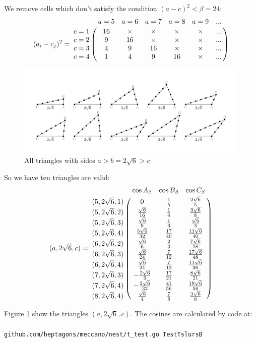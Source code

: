 \documentclass[11pt]{article}
\begin{document}
We remove cells which don't satisfy the condition $(a-c)^2 < \beta = 24$:
\begin {equation}\label{E:12}
(a_i - c_j)^2 =\bordermatrix{~ & a=5 & a=6 & a=7 & a=8 & a=9 & ...\cr
c=1 & 16 & \times & \times & \times & \times & ...\cr    
c=2 &  9 & 16 & \times & \times & \times & ...\cr    
c=3 &  4 &  9 & 16 & \times & \times & ...\cr    
c=4 &  1 &  4 &  9 & 16 & \times & ...\cr}
\end {equation}

\begin{figure}[htp]
\centering
\includegraphics[scale=0.9]{tslurB}
\caption{All triangles with sides $a > b = 2\sqrt{6} > c$}
\label{tslurB}
\end{figure}

So we have ten triangles are valid:
\begin {equation}\label{E:13}
(a,2\sqrt{6},c) =\bordermatrix{~ & \cos{A_{\beta}} & \cos{B_{\beta}} & \cos{C_{\beta}} \cr
(5,2\sqrt{6},1) & 0         & \frac{1}{5} & \frac{2\sqrt{6}}{5} \cr
(5,2\sqrt{6},2) & \frac{\sqrt{6}}{16} & \frac{1}{4} & \frac{3\sqrt{6}}{8} \cr
(5,2\sqrt{6},3) & \frac{\sqrt{6}}{9} & \frac{1}{3} & \frac{\sqrt{6}}{3} \cr
(5,2\sqrt{6},4) & \frac{5\sqrt{6}}{32} & \frac{17}{40} & \frac{11\sqrt{6}}{40} \cr
(6,2\sqrt{6},2) & \frac{\sqrt{6}}{6} & \frac{2}{3} & \frac{7\sqrt{6}}{18} \cr
(6,2\sqrt{6},3) & \frac{\sqrt{6}}{24} & \frac{7}{12} & \frac{17\sqrt{6}}{48} \cr
(6,2\sqrt{6},4) & \frac{\sqrt{6}}{24} & \frac{7}{12} & \frac{11\sqrt{6}}{36} \cr
(7,2\sqrt{6},3) & -\frac{2\sqrt{6}}{9} & \frac{17}{21} & \frac{8\sqrt{6}}{21} \cr
(7,2\sqrt{6},4) & -\frac{3\sqrt{6}}{32} & \frac{41}{56} & \frac{19\sqrt{6}}{56} \cr
(8,2\sqrt{6},4) & \frac{\sqrt{6}}{4} & \frac{7}{8} & \frac{3\sqrt{6}}{8} \cr}
\end{equation}

Figure \ref{tslurB} show the triangles $(a,2\sqrt{6},c)$. The cosines are calculated by code at:
\\\\
\texttt{github.com/heptagons/meccano/nest/t\_test.go TestTslursB}
\end{document}
